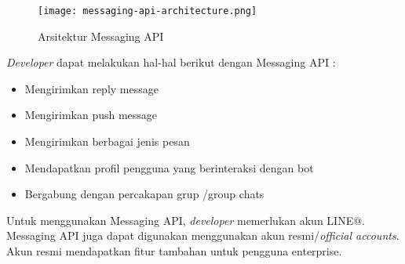 \begin{figure}[H]
	\centering  
	\texttt{[image: messaging-api-architecture.png]}  
	\caption[Arsitektur Messaging API]{Arsitektur Messaging API} 
	\label{fig:messaging_api_architecture} 
\end{figure}

\textit{Developer} dapat melakukan hal-hal berikut dengan Messaging API :
\begin{itemize}
\item Mengirimkan reply message
\item Mengirimkan push message
\item Mengirimkan berbagai jenis pesan
\item Mendapatkan profil pengguna yang berinteraksi dengan bot
\item Bergabung dengan percakapan grup /group chats
\end{itemize}

Untuk menggunakan Messaging API, \textit{developer} memerlukan akun LINE@. Messaging API juga dapat digunakan menggunakan akun resmi/\textit{official accounts}. Akun resmi mendapatkan fitur tambahan untuk pengguna enterprise.

